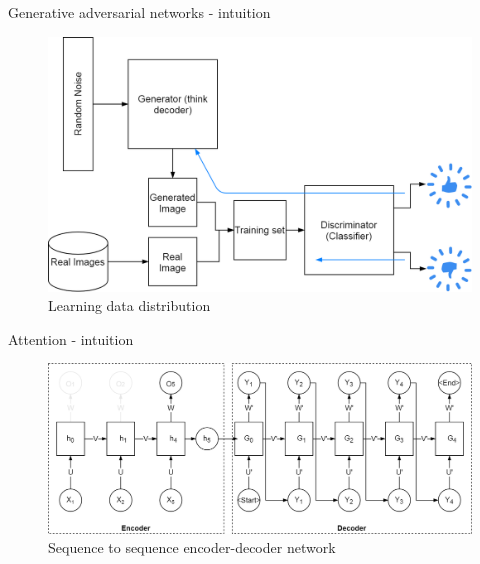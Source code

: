 \begin{frame}{Generative adversarial networks - intuition}
\begin{center}
	\begin{figure}
		\includegraphics[width=.8\textwidth]{figures/gan-simple}
		\caption*{Learning data distribution}
	\end{figure}
\end{center}
\end{frame}

\begin{frame}{Attention - intuition} 
\begin{center}
	\begin{figure}
		\includegraphics[width=1\textwidth]{figures/rnn_seq_2_seq_encoder_decoder}
		\caption*{{Sequence to sequence encoder-decoder network}}
	\end{figure}
\end{center}
\end{frame}